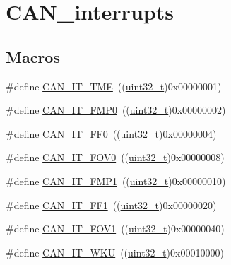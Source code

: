 \hypertarget{group___c_a_n__interrupts}{}\section{C\+A\+N\+\_\+interrupts}
\label{group___c_a_n__interrupts}
\subsection*{Macros}
\begin{DoxyCompactItemize}
\item 
\#define \hyperlink{group___c_a_n__interrupts_ga619e36230fa2eb089a7c1936b5004eb9}{C\+A\+N\+\_\+\+I\+T\+\_\+\+T\+ME}~((\hyperlink{_p_e___types_8h_a33594304e786b158f3fb30289278f5af}{uint32\+\_\+t})0x00000001)
\item 
\#define \hyperlink{group___c_a_n__interrupts_ga3fe6fbf53e9d692957e87ad329bcd362}{C\+A\+N\+\_\+\+I\+T\+\_\+\+F\+M\+P0}~((\hyperlink{_p_e___types_8h_a33594304e786b158f3fb30289278f5af}{uint32\+\_\+t})0x00000002)
\item 
\#define \hyperlink{group___c_a_n__interrupts_gabf63043d9216de80ddc7ffe57b23ef67}{C\+A\+N\+\_\+\+I\+T\+\_\+\+F\+F0}~((\hyperlink{_p_e___types_8h_a33594304e786b158f3fb30289278f5af}{uint32\+\_\+t})0x00000004)
\item 
\#define \hyperlink{group___c_a_n__interrupts_ga066a4317f95669e5b5931c9a759cf248}{C\+A\+N\+\_\+\+I\+T\+\_\+\+F\+O\+V0}~((\hyperlink{_p_e___types_8h_a33594304e786b158f3fb30289278f5af}{uint32\+\_\+t})0x00000008)
\item 
\#define \hyperlink{group___c_a_n__interrupts_gaa0e101053fb203629e0e9a954213e71e}{C\+A\+N\+\_\+\+I\+T\+\_\+\+F\+M\+P1}~((\hyperlink{_p_e___types_8h_a33594304e786b158f3fb30289278f5af}{uint32\+\_\+t})0x00000010)
\item 
\#define \hyperlink{group___c_a_n__interrupts_ga93b86d884ce0624b4b36c991fd75fc1c}{C\+A\+N\+\_\+\+I\+T\+\_\+\+F\+F1}~((\hyperlink{_p_e___types_8h_a33594304e786b158f3fb30289278f5af}{uint32\+\_\+t})0x00000020)
\item 
\#define \hyperlink{group___c_a_n__interrupts_ga963301fdbede5f9a9665dc5b6210eaec}{C\+A\+N\+\_\+\+I\+T\+\_\+\+F\+O\+V1}~((\hyperlink{_p_e___types_8h_a33594304e786b158f3fb30289278f5af}{uint32\+\_\+t})0x00000040)
\item 
\#define \hyperlink{group___c_a_n__interrupts_gac9c8767770d94de753dda9ad31f9af15}{C\+A\+N\+\_\+\+I\+T\+\_\+\+W\+KU}~((\hyperlink{_p_e___types_8h_a33594304e786b158f3fb30289278f5af}{uint32\+\_\+t})0x00010000)

\end{DoxyCompactItemize}
